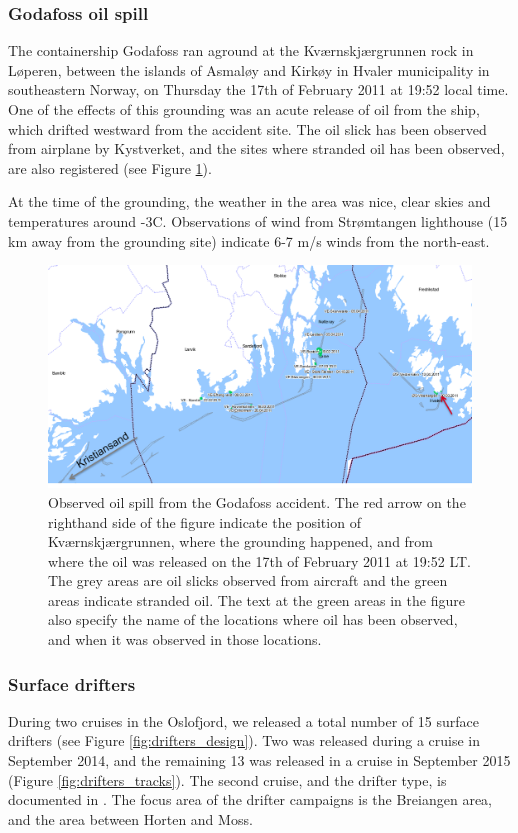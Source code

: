 \subsubsection{Godafoss oil spill}
The containership Godafoss ran aground at the Kv{\ae}rnskj{\ae}rgrunnen rock in L{\o}peren, between the islands of Asmal{\o}y and Kirk{\o}y in Hvaler municipality in southeastern Norway, on Thursday the 17th of February 2011 at 19:52 local time. One of the effects of this grounding was an acute release of oil from the ship, which drifted westward from the accident site. The oil slick has been observed from airplane by Kystverket, and the sites where stranded oil has been observed, are also registered (see Figure \ref{fig:godafoss_oil}).

At the time of the grounding, the weather in the area was nice, clear skies and temperatures around -3C. Observations of wind from Str{\o}mtangen lighthouse (15 km away from the grounding site) indicate 6-7 m/s winds from the north-east.

\begin{figure}[ht]
\centerline{
\includegraphics*[width=\textwidth]{Figurer/Godafoss}
}
\caption{\small
Observed oil spill from the Godafoss accident. The red arrow on the righthand side of the figure indicate the position of Kv{\ae}rnskj{\ae}rgrunnen, where the grounding happened, and from where the oil was released on the 17th of February 2011 at 19:52 LT. The grey areas are oil slicks observed from aircraft and the green areas indicate stranded oil. The text at the green areas in the figure also specify the name of the locations where oil has been observed, and when it was observed in those locations.}
\label{fig:godafoss_oil}
\end{figure}

\subsubsection{Surface drifters}
During two cruises in the Oslofjord, we released a total number of 15 surface drifters (see Figure \ref{fig:drifters_design}). Two was released during a cruise in September 2014, and the remaining 13 was released in a cruise in September 2015 (Figure \ref{fig:drifters_tracks}). The second cruise, and the drifter type, is documented in \cite{hjelm:etal:2016}. The focus area of the drifter campaigns is the Breiangen area, and the area between Horten and Moss.

